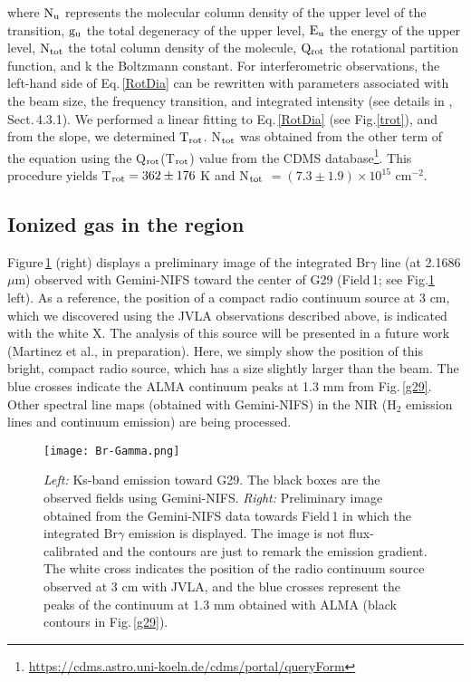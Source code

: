 \documentclass[baaa]{baaa}
\begin{document}
\noindent
where ${\rm N_u}$ represents the molecular column density of the upper level of the transition, ${\rm g_u}$  the total degeneracy of the upper level, ${\rm E_u}$ the energy of the upper level, ${\rm N_{tot}}$ the total column density of the molecule, ${\rm Q_{rot}}$ the rotational partition function, and k the Boltzmann constant. For interferometric observations, the left-hand side of Eq.\,\ref{RotDia} can be rewritten with parameters associated with the beam size, the frequency transition, and integrated intensity (see details in \citealt{ortega23}, Sect.\,4.3.1).
We performed a linear fitting to Eq.\,\ref{RotDia} (see Fig.\ref{trot}), and from the slope, we determined ${\rm T_{rot}}$. N$\rm_{tot}$ was obtained from the other term of the equation using the Q$\rm_{rot}$(T$\rm_{rot}$) value from the CDMS database\footnote{\url{https://cdms.astro.uni-koeln.de/cdms/portal/queryForm}}. This procedure yields T$_{\rm rot} = 362\pm176$ K and N$_{\rm tot}$ $ = (7.3\pm1.9)\times10^{15}$ cm$^{-2}$.  

\subsection{Ionized gas in the region}

Figure\,\ref{gemini} (right) displays a preliminary image of the integrated Br$\gamma$ line (at 2.1686 $\mu$m) observed with Gemini-NIFS toward the center of G29 (Field\,1; see Fig.\ref{gemini} left). As a reference, the position of a compact radio continuum source at 3 cm, which we discovered using the JVLA observations described above, is indicated with the white X. The analysis of this source will be presented in a future work (Martinez et al., in preparation). Here, we simply show the position of this bright, compact radio source, which has a size slightly larger than the beam.
The blue crosses indicate the ALMA continuum peaks at 1.3 mm from Fig.\,\ref{g29}. Other spectral line maps (obtained with Gemini-NIFS) in the NIR (H$_{2}$ emission lines and continuum emission) are being processed.

\begin{figure}
    \centering
    \texttt{[image: Br-Gamma.png]}
    \caption{\textit{Left:} Ks-band emission toward G29. The black boxes are the observed fields using Gemini-NIFS. \textit{Right:} Preliminary image obtained from the Gemini-NIFS data towards Field\,1 in which the integrated Br$\gamma$ emission is displayed. The image is not flux-calibrated and the contours are just to remark the emission gradient. The white cross indicates the position of the radio continuum source observed at 3 cm with JVLA, and the blue crosses represent the peaks of the continuum at 1.3 mm obtained with ALMA (black contours in Fig.\,\ref{g29}).}
    \label{gemini}
\end{figure} 
\end{document}
